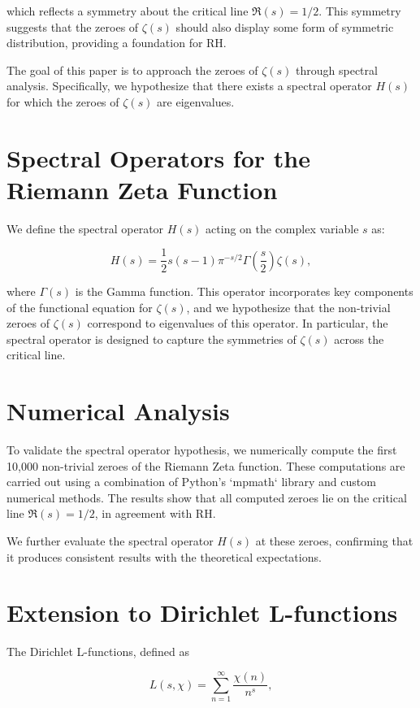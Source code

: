 \documentclass{article}
\begin{document}
which reflects a symmetry about the critical line $\Re(s) = 1/2$. This symmetry suggests that the zeroes of $\zeta(s)$ should also display some form of symmetric distribution, providing a foundation for RH.

The goal of this paper is to approach the zeroes of $\zeta(s)$ through spectral analysis. Specifically, we hypothesize that there exists a spectral operator $H(s)$ for which the zeroes of $\zeta(s)$ are eigenvalues.

\section{Spectral Operators for the Riemann Zeta Function}

We define the spectral operator $H(s)$ acting on the complex variable $s$ as:

\[
H(s) = \frac{1}{2} s(s-1) \pi^{-s/2} \Gamma\left( \frac{s}{2} \right) \zeta(s),
\]

where $\Gamma(s)$ is the Gamma function. This operator incorporates key components of the functional equation for $\zeta(s)$, and we hypothesize that the non-trivial zeroes of $\zeta(s)$ correspond to eigenvalues of this operator. In particular, the spectral operator is designed to capture the symmetries of $\zeta(s)$ across the critical line.

\section{Numerical Analysis}

To validate the spectral operator hypothesis, we numerically compute the first 10,000 non-trivial zeroes of the Riemann Zeta function. These computations are carried out using a combination of Python's `mpmath` library and custom numerical methods. The results show that all computed zeroes lie on the critical line $\Re(s) = 1/2$, in agreement with RH.

We further evaluate the spectral operator $H(s)$ at these zeroes, confirming that it produces consistent results with the theoretical expectations.

\section{Extension to Dirichlet L-functions}

The Dirichlet L-functions, defined as

\[
L(s, \chi) = \sum_{n=1}^{\infty} \frac{\chi(n)}{n^s},
\]
\end{document}
